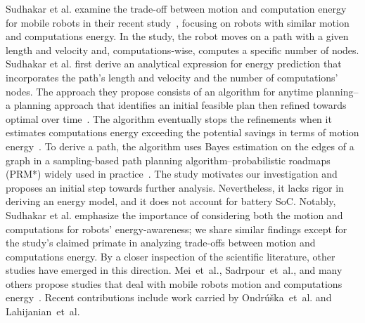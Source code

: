 Sudhakar et al. examine the trade-off between motion and computation energy for mobile robots in their recent study~\citep{sudhakar2020balancing}, focusing on robots with similar motion and computations energy. In the study, the robot moves on a path with a given length and velocity and, computations-wise, computes a specific number of nodes. Sudhakar et al. first derive an analytical expression for energy prediction that incorporates the path's length and velocity and the number of computations' nodes. The approach they propose consists of an algorithm for anytime planning--a planning approach that identifies an initial feasible plan then refined towards optimal over time~\citep{karaman2011anytime}. The algorithm eventually stops the refinements when it estimates computations energy exceeding the potential savings in terms of motion energy~\citep{sudhakar2020balancing}. To derive a path, the algorithm uses Bayes estimation on the edges of a graph in a sampling-based path planning algorithm--probabilistic roadmaps (PRM*) widely used in practice~\citep{lavalle2006planning,karaman2011sampling}. The study motivates our investigation and proposes an initial step towards further analysis. Nevertheless, it lacks rigor in deriving an energy model, and it does not account for battery SoC. Notably, Sudhakar et al. emphasize the importance of considering both the motion and computations for robots' energy-awareness; we share similar findings except for the study's claimed primate in analyzing trade-offs between motion and computations energy. By a closer inspection of the scientific literature, other studies have emerged in this direction. Mei~et~al., Sadrpour~et~al., and many others propose studies that deal with mobile robots motion and computations energy~\citep{mei2005case,mei2006deployment,brateman2006energy,zhang2007low,sadrpour2013experimental,sadrpour2013mission}. Recent contributions include work carried by Ondr\'{u}\v{s}ka~et~al. and Lahijanian~et~al.~\citep{ondruska2015scheduled,lahijanian2018resource}

